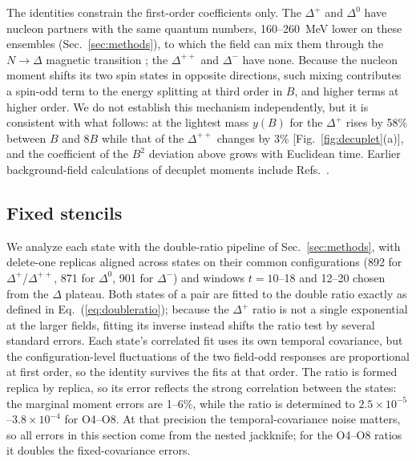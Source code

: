 \documentclass[aps,prd,preprint,nofootinbib,floatfix]{revtex4-2}
\begin{document}
The identities constrain the first-order coefficients only. The $\Delta^+$ and $\Delta^0$ have nucleon partners with the same quantum numbers, 160--260~MeV lower on these ensembles (Sec.~\ref{sec:methods}), to which the field can mix them through the $N\to\Delta$ magnetic transition \cite{Batelaan2023,DeshmukhTiburzi2018}; the $\Delta^{++}$ and $\Delta^-$ have none. Because the nucleon moment shifts its two spin states in opposite directions, such mixing contributes a spin-odd term to the energy splitting at third order in $B$, and higher terms at higher order. We do not establish this mechanism independently, but it is consistent with what follows: at the lightest mass $y(B)$ for the $\Delta^+$ rises by 58\% between $B$ and $8B$ while that of the $\Delta^{++}$ changes by 3\% [Fig.~\ref{fig:decuplet}(a)], and the coefficient of the $B^2$ deviation above grows with Euclidean time. Earlier background-field calculations of decuplet moments include Refs.~\cite{Lee2005BaryonMom,Aubin2009Delta}.

\subsection{Fixed stencils}

We analyze each state with the double-ratio pipeline of Sec.~\ref{sec:methods}, with delete-one replicas aligned across states on their common configurations (892 for $\Delta^+$/$\Delta^{++}$, 871 for $\Delta^0$, 901 for $\Delta^-$) and windows $t=10$--18 and 12--20 chosen from the $\Delta$ plateau. Both states of a pair are fitted to the double ratio exactly as defined in Eq.~(\ref{eq:doubleratio}); because the $\Delta^+$ ratio is not a single exponential at the larger fields, fitting its inverse instead shifts the ratio test by several standard errors. Each state's correlated fit uses its own temporal covariance, but the configuration-level fluctuations of the two field-odd responses are proportional at first order, so the identity survives the fits at that order. The ratio is formed replica by replica, so its error reflects the strong correlation between the states: the marginal moment errors are 1--6\%, while the ratio is determined to $2.5\times10^{-5}$--$3.8\times10^{-4}$ for O4--O8. At that precision the temporal-covariance noise matters, so all errors in this section come from the nested jackknife; for the O4--O8 ratios it doubles the fixed-covariance errors.
\end{document}
